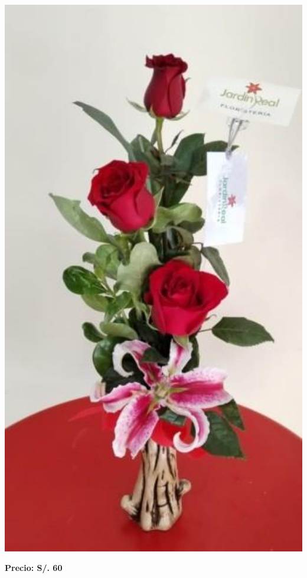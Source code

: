 \documentclass{article}
\begin{document}
\begin{minipage}{0.35\textwidth}
    \includegraphics[width=1.0\textwidth]{imagenes_extraidas/image_7_4}
\end{minipage}
\vspace{0.3cm}
\begin{center}
   \textbf{\Large Precio: \textcolor{cpred}{S/. 60 }}
\end{center}
\vspace{1cm}
\end{document}
